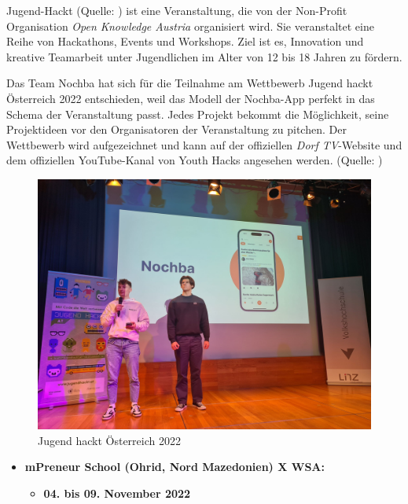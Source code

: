 Jugend-Hackt (Quelle: \cite{jugendhackt} ) ist eine Veranstaltung, die von der Non-Profit Organisation \textit{Open Knowledge Austria} organisiert wird. Sie veranstaltet eine Reihe von Hackathons, Events und Workshops. Ziel ist es, Innovation und kreative Teamarbeit unter Jugendlichen im Alter von 12 bis 18 Jahren zu fördern.

Das Team Nochba hat sich für die Teilnahme am Wettbewerb Jugend hackt Österreich 2022 entschieden, weil das Modell der Nochba-App perfekt in das Schema der Veranstaltung passt. Jedes Projekt bekommt die Möglichkeit, seine Projektideen vor den Organisatoren der Veranstaltung zu pitchen. Der Wettbewerb wird aufgezeichnet und kann auf der offiziellen \textit{Dorf TV}-Website und dem offiziellen YouTube-Kanal von Youth Hacks angesehen werden. (Quelle: \cite{youtube-jugendhackt-pitch} )


\begin{figure}[H]
    \centering
    \includegraphics[width=1\textwidth]{pics/JugendHackt.jpeg}
    \caption{Jugend hackt Österreich 2022}
    \label{fig:jugendHackt}
\end{figure}

\begin{itemize}
    \item \textbf{mPreneur School (Ohrid, Nord Mazedonien) X WSA:}
          \begin{itemize}
              \item \textbf{04. bis 09. November 2022}
          \end{itemize}
\end{itemize}

